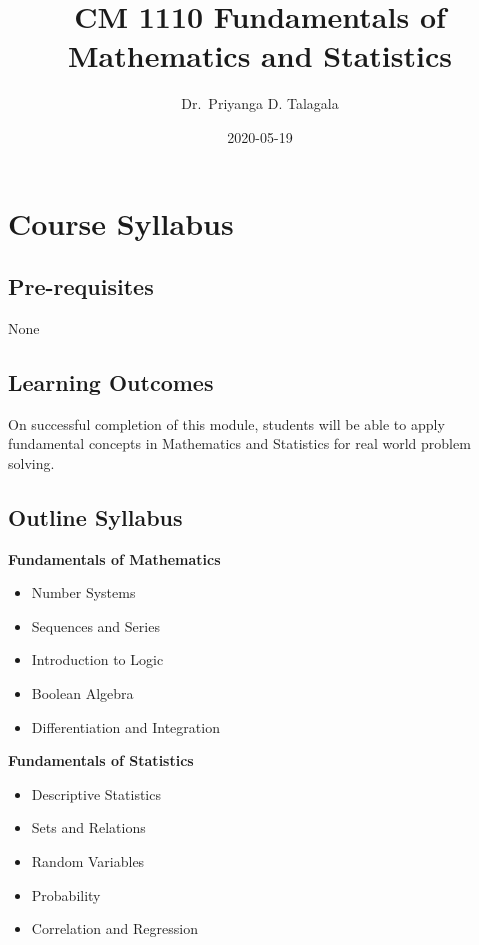 \documentclass[]{book}
\title{CM 1110 Fundamentals of Mathematics and Statistics}
\author{Dr.~Priyanga D. Talagala}
\date{2020-05-19}
\providecommand{\tightlist}{%
  \setlength{\itemsep}{0pt}\setlength{\parskip}{0pt}}
\begin{document}
\maketitle

{
\setcounter{tocdepth}{1}
\tableofcontents
}
\hypertarget{course-syllabus}{%
\chapter*{Course Syllabus}\label{course-syllabus}}

\hypertarget{pre-requisites}{%
\section*{Pre-requisites}\label{pre-requisites}}

None

\hypertarget{learning-outcomes}{%
\section*{Learning Outcomes}\label{learning-outcomes}}

On successful completion of this module, students will be able to apply fundamental concepts in Mathematics and Statistics for real world problem solving.

\hypertarget{outline-syllabus}{%
\section*{Outline Syllabus}\label{outline-syllabus}}

\textbf{Fundamentals of Mathematics}

\begin{itemize}
\tightlist
\item
  Number Systems
\item
  Sequences and Series
\item
  Introduction to Logic
\item
  Boolean Algebra
\item
  Differentiation and Integration
\end{itemize}

\textbf{Fundamentals of Statistics}

\begin{itemize}
\tightlist
\item
  Descriptive Statistics
\item
  Sets and Relations
\item
  Random Variables
\item
  Probability
\item
  Correlation and Regression
\end{itemize}
\end{document}
